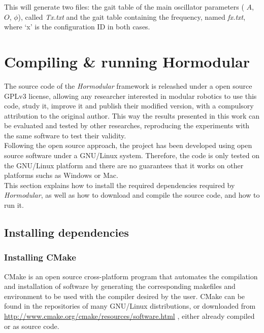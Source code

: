 This will generate two files: the gait table of the main oscillator parameters ( $A$, $O$, $\phi$), called \emph{Tx.txt} and the gait table containing the frequency, named \emph{fx.txt}, where `x' is the configuration ID in both cases.


\section{Compiling \& running Hormodular}
\label{software_compile}

The source code of the \emph{Hormodular} framework is releashed under a open source GPLv3 license, allowing any researcher interested in modular robotics to use this code, study it, improve it and publish their modified version, with a compulsory attribution to the original author. This way the results presented in this work can be evaluated and tested by other researches, reproducing the experiments with the same software to test their validity.\\

Following the open source approach, the project has been developed using open source software under a GNU/Linux system. Therefore, the code is only tested on the GNU/Linux platform and there are no guarantees that it works on other platforms suchs as Windows or Mac.\\

This section explains how to install the required dependencies required by \emph{Hormodular}, as well as how to download and compile the source code, and how to run it.

\subsection{Installing dependencies}
\label{software_install_dependencies}

\subsubsection{Installing CMake}
\label{software_install_cmake}
CMake is an open source cross-platform program that automates the compilation and installation of software by generating the corresponding makefiles and environment to be used with the compiler desired by the user. CMake can be found in the repositories of many GNU/Linux distributions, or downloaded from \url{http://www.cmake.org/cmake/resources/software.html} , either already compiled or as source code.\\

